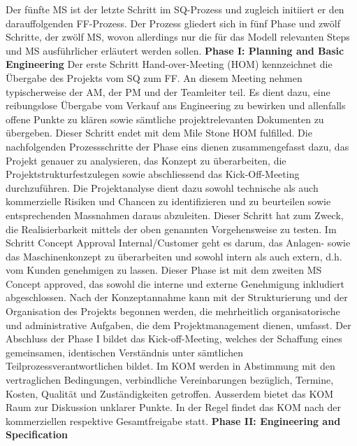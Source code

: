 \documentclass[11pt]{article}
\begin{document}
\newline
Der fünfte MS ist der letzte Schritt im SQ-Prozess und zugleich initiiert er den darauffolgenden FF-Prozess. Der Prozess gliedert sich in fünf Phase und zwölf Schritte, der zwölf MS, wovon allerdings nur die für das Modell relevanten Steps und MS ausführlicher erläutert werden sollen.
\newline
\textbf{Phase I: Planning and Basic Engineering}
\newline
Der erste Schritt Hand-over-Meeting (HOM) kennzeichnet die Übergabe des Projekts vom SQ zum FF. An diesem Meeting nehmen typischerweise der AM, der PM und der Teamleiter teil. Es dient dazu, eine reibungslose Übergabe vom Verkauf ans Engineering zu bewirken und allenfalls offene Punkte zu klären sowie sämtliche projektrelevanten Dokumenten zu übergeben. Dieser Schritt endet mit dem Mile Stone HOM fulfilled. Die nachfolgenden Prozessschritte der Phase eins dienen zusammengefasst dazu, das Projekt genauer zu analysieren, das Konzept zu überarbeiten, die Projektstrukturfestzulegen sowie abschliessend das Kick-Off-Meeting durchzuführen. Die Projektanalyse dient dazu sowohl technische als auch kommerzielle Risiken und Chancen zu identifizieren und zu beurteilen sowie entsprechenden Massnahmen daraus abzuleiten. Dieser Schritt hat zum Zweck, die Realisierbarkeit mittels der oben genannten Vorgehensweise zu testen. Im Schritt Concept Approval Internal/Customer geht es darum, das Anlagen- sowie das Maschinenkonzept zu überarbeiten und sowohl intern als auch extern, d.h. vom Kunden genehmigen zu lassen. Dieser Phase ist mit dem zweiten MS Concept approved, das sowohl die interne und externe Genehmigung inkludiert abgeschlossen. Nach der Konzeptannahme kann mit der Strukturierung und der Organisation des Projekts begonnen werden, die mehrheitlich organisatorische und administrative Aufgaben, die dem Projektmanagement dienen, umfasst. Der Abschluss der Phase I bildet das Kick-off-Meeting, welches der Schaffung eines gemeinsamen, identischen Verständnis unter sämtlichen Teilprozessverantwortlichen bildet. Im KOM werden in Abstimmung mit den vertraglichen Bedingungen, verbindliche Vereinbarungen bezüglich, Termine, Kosten, Qualität und Zuständigkeiten getroffen. Ausserdem bietet das KOM Raum zur Diskussion unklarer Punkte. In der Regel findet das KOM nach der kommerziellen respektive Gesamtfreigabe statt.
\newline
\textbf{Phase II: Engineering and Specification}
\newline
\end{document}
